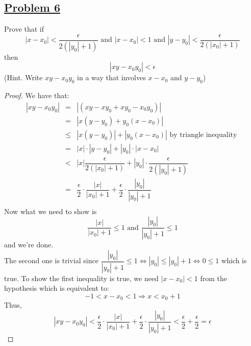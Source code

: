 \documentclass[10pt,letterpaper]{article}
\begin{document}
	\subsection*{{\color{purple}\underline{Problem 6}}}
	Prove that if 
	$$|x - x_0| < \dfrac{\epsilon}{2(|y_0| + 1)} \text{ and } |x - x_0| < 1 \text{ and }
	|y - y_0| < \dfrac{\epsilon}{2(|x_0| + 1)}$$
	then $$|xy - x_0y_0| < \epsilon$$
	(Hint. Write $xy - x_0y_0$ in a way that involves $x - x_0$ and $y - y_0$) 
	\begin{proof}
	We have that:
	\begin{eqnarray*}
		|xy - x_0y_0| &=& |(xy - xy_0 + xy_0 - x_0y_0)| \\
		&=& |x(y - y_0) + y_0(x - x_0)| \\
		&\leq& |x(y - y_0)| + |y_0(x - x_0)| \text{ by triangle inequality }\\
		&=& |x| \cdot |y - y_0| + |y_0| \cdot |x - x_0| \\
		&<& |x| \dfrac{\epsilon}{2(|x_0| + 1)} +  |y_0| \cdot \dfrac{\epsilon}{2(|y_0| + 1)}\\
		&=& \dfrac{\epsilon}{2} \cdot \dfrac{|x|}{|x_0| + 1} +  \dfrac{\epsilon}{2} \cdot \dfrac{|y_0|}{|y_0| + 1}\\
	\end{eqnarray*}
	Now what we need to show is 
	$$\dfrac{|x|}{|x_0| + 1} \leq 1 \text{ and } \dfrac{|y_0|}{|y_0| + 1} \leq 1$$
	and we're done. \\
	The second one is trivial since $\dfrac{|y_0|}{|y_0| + 1} \leq 1
	\Leftrightarrow |y_0| \leq |y_0| + 1 \Leftrightarrow 0 \leq 1$ which is true. To show the first inequality is true, we need
	$|x - x_0| < 1$ from the hypothesis which is equivalent to:
	$$-1 < x - x_0 < 1 \Rightarrow x < x_0 + 1$$
	Thus,
	$$|xy - x_0y_0| < \dfrac{\epsilon}{2} \cdot \dfrac{|x|}{|x_0| + 1} +  \dfrac{\epsilon}{2} \cdot \dfrac{|y_0|}{|y_0| + 1} < 
	\dfrac{\epsilon}{2} + \dfrac{\epsilon}{2} = \epsilon$$
	\end{proof}
	
\end{document}
